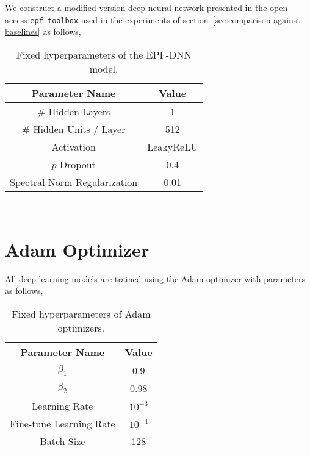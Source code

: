 We construct a modified version deep neural network presented in the open-access \texttt{epf-toolbox} used in the
experiments of section~\ref{sec:comparison-against-baselines} as follows,

\begin{table}[htb]
    \caption[EPF-DNN Hyperparameters]{
        Fixed hyperparameters of the EPF-DNN model.
    }
    \begin{center}
        \begin{tabular}{|c|c|} \hline
        Parameter Name & Value  \\	%
        \hline \hline
        \# Hidden Layers             & 1 \\ \hline
        \# Hidden Units / Layer      & 512 \\ \hline
        Activation                   & LeakyReLU \\ \hline
        $p$-Dropout                  & 0.4 \\ \hline
        Spectral Norm Regularization & 0.01 \\ \hline
        \end{tabular}
        \\ \rule{0mm}{5mm}
    \end{center}
    \label{tab:epf_dnn_params}
\end{table}

\section{Adam Optimizer}\label{sec:adam-optimizer}

All deep-learning models are trained using the Adam optimizer with parameters as follows,

\begin{table}[htb]
    \caption[Adam Hyperparameters]{
        Fixed hyperparameters of Adam optimizers.
    }
    \begin{center}
        \begin{tabular}{|c|c|} \hline
        Parameter Name & Value  \\	%
        \hline \hline
        $\beta_1$               & 0.9       \\ \hline
        $\beta_2$               & 0.98      \\ \hline
        Learning Rate           & $10^{-3}$ \\ \hline
        Fine-tune Learning Rate & $10^{-4}$ \\ \hline
        Batch Size              & 128       \\ \hline
        \end{tabular}
        \\ \rule{0mm}{5mm}
    \end{center}
    \label{tab:adam_params}
\end{table}